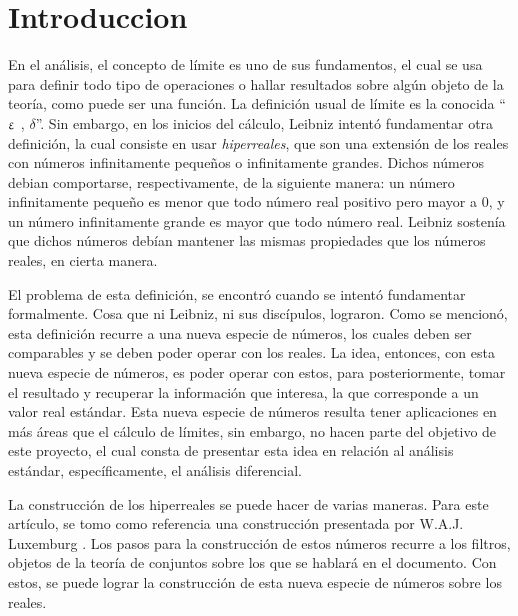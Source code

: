 \section{Introduccion}

En el análisis, el concepto de límite es uno de sus fundamentos,
el cual se usa para definir todo tipo de operaciones o hallar
resultados sobre algún objeto de la teoría, como puede ser una
función. La definición usual de límite es la conocida
``$\upvarepsilon$ , $\delta$''. Sin embargo, en los inicios del cálculo,
Leibniz intentó fundamentar otra definición, la cual consiste en
usar \emph{hiperreales}, que son una extensión de los reales con
números infinitamente pequeños o infinitamente grandes. Dichos números
debian comportarse, respectivamente, de la siguiente manera: un número
infinitamente pequeño es menor que todo número real positivo
pero mayor a $0$, y un número infinitamente grande es mayor que todo
número real. Leibniz sostenía que dichos números debían mantener las
mismas propiedades que los números reales, en cierta manera.

El problema de esta definición, se encontró cuando se intentó fundamentar
formalmente. Cosa que ni Leibniz, ni sus discípulos, lograron.
Como se mencionó, esta definición recurre a una nueva especie de números, los cuales
deben ser comparables y se deben poder operar con los reales. La idea,
entonces, con esta nueva especie de números, es poder operar con estos,
para posteriormente, tomar el resultado y recuperar la información que interesa,
la que corresponde a un valor real estándar. Esta nueva especie de números
resulta tener aplicaciones en más áreas que el cálculo de límites, sin
embargo, no hacen parte del objetivo de este proyecto, el cual consta de
presentar esta idea en relación al análisis estándar, específicamente,
el análisis diferencial.

La construcción de los hiperreales se puede hacer de varias maneras. Para este
artículo, se tomo como referencia una construcción presentada por W.A.J. Luxemburg
\cite{Luxemburg}.
Los pasos para la construcción de estos números recurre a los filtros,
objetos de la teoría de conjuntos sobre los que se hablará en el
documento. Con estos, se puede lograr la construcción de esta nueva especie
de números sobre los reales.
